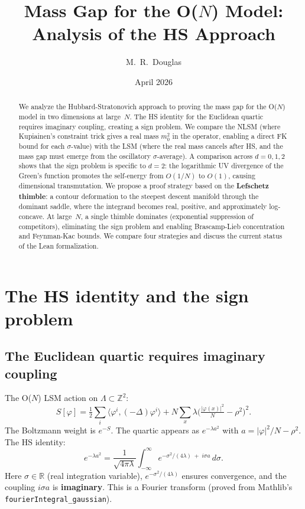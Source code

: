\documentclass[12pt]{article}
\title{Mass Gap for the O($N$) Model: Analysis of the HS Approach}
\author{M.~R.~Douglas}
\date{April 2026}
\theoremstyle{definition}
\theoremstyle{remark}
\newcommand{\R}{\mathbb{R}}
\newcommand{\Z}{\mathbb{Z}}
\newcommand{\ph}{\varphi}
\newcommand{\La}{\Lambda}
\begin{document}
\maketitle

\begin{abstract}
We analyze the Hubbard-Stratonovich approach to proving the mass
gap for the O($N$) model in two dimensions at large~$N$. The HS
identity for the Euclidean quartic requires imaginary coupling,
creating a sign problem. We compare the NLSM (where Kupiainen's
constraint trick gives a real mass $m_0^2$ in the operator, enabling
a direct FK bound for each $\sigma$-value) with the LSM (where the
real mass cancels after HS, and the mass gap must emerge from the
oscillatory $\sigma$-average). A comparison across $d=0,1,2$ shows
that the sign problem is specific to $d=2$: the logarithmic UV
divergence of the Green's function promotes the self-energy from
$O(1/N)$ to $O(1)$, causing dimensional transmutation. We propose
a proof strategy based on the \textbf{Lefschetz thimble}: a contour
deformation to the steepest descent manifold through the dominant
saddle, where the integrand becomes real, positive, and approximately
log-concave. At large~$N$, a single thimble dominates (exponential
suppression of competitors), eliminating the sign problem and
enabling Brascamp-Lieb concentration and Feynman-Kac bounds. We
compare four strategies and discuss the current status of the Lean
formalization.
\end{abstract}

\tableofcontents

\section{The HS identity and the sign problem}

\subsection{The Euclidean quartic requires imaginary coupling}

The O($N$) LSM action on $\La \subset \Z^2$:
\begin{equation}
  S[\ph] = \tfrac{1}{2}\sum_i\langle\ph^i,(-\Delta)\ph^i\rangle
    + N\sum_x\lambda\bigl(\tfrac{|\ph(x)|^2}{N}-\rho^2\bigr)^2.
\end{equation}
The Boltzmann weight is $e^{-S}$. The quartic appears as
$e^{-\lambda a^2}$ with $a = |\ph|^2/N - \rho^2$. The HS identity:
\begin{equation}
\label{eq:HS}
  e^{-\lambda a^2}
    = \frac{1}{\sqrt{4\pi\lambda}}\int_{-\infty}^{\infty}
      e^{-\sigma^2/(4\lambda)\;+\;i\sigma a}\,d\sigma.
\end{equation}
Here $\sigma \in \R$ (real integration variable),
$e^{-\sigma^2/(4\lambda)}$ ensures convergence, and the coupling
$i\sigma a$ is \textbf{imaginary}. This is a Fourier transform
(proved from Mathlib's \texttt{fourierIntegral\_gaussian}).
\end{document}
